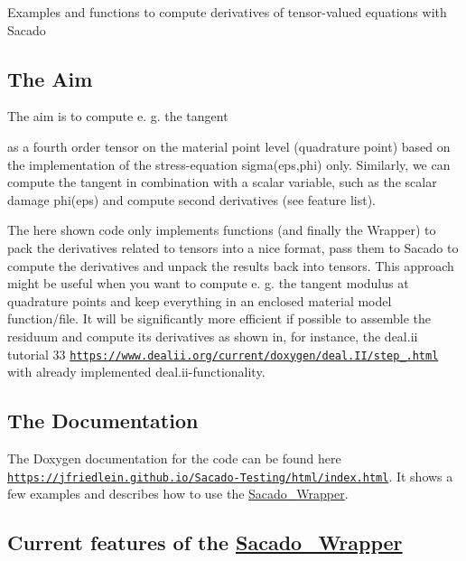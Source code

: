 Examples and functions to compute derivatives of tensor-\/valued equations with Sacado

\subsection*{The Aim}

The aim is to compute e. g. the tangent

\href{https://www.codecogs.com/eqnedit.php?latex=\overset{4}{C}&space;=&space;\frac{\partial\boldsymbol{\sigma}}{\partial\boldsymbol{\varepsilon&space;}}}{\tt }

as a fourth order tensor on the material point level (quadrature point) based on the implementation of the stress-\/equation sigma(eps,phi) only. Similarly, we can compute the tangent in combination with a scalar variable, such as the scalar damage phi(eps) and compute second derivatives (see feature list).

The here shown code only implements functions (and finally the Wrapper) to pack the derivatives related to tensors into a nice format, pass them to Sacado to compute the derivatives and unpack the results back into tensors. This approach might be useful when you want to compute e. g. the tangent modulus at quadrature points and keep everything in an enclosed material model function/file. It will be significantly more efficient if possible to assemble the residuum and compute its derivatives as shown in, for instance, the deal.\+ii tutorial 33 \href{https://www.dealii.org/current/doxygen/deal.II/step_33.html}{\tt https\+://www.\+dealii.\+org/current/doxygen/deal.\+I\+I/step\+\_.\+html} with already implemented deal.\+ii-\/functionality.

\subsection*{The Documentation}

The Doxygen documentation for the code can be found here \href{https://jfriedlein.github.io/Sacado-Testing/html/index.html}{\tt https\+://jfriedlein.\+github.\+io/\+Sacado-\/\+Testing/html/index.\+html}. It shows a few examples and describes how to use the \hyperlink{namespaceSacado__Wrapper}{Sacado\+\_\+\+Wrapper}.

\subsection*{Current features of the \hyperlink{namespaceSacado__Wrapper}{Sacado\+\_\+\+Wrapper}}

